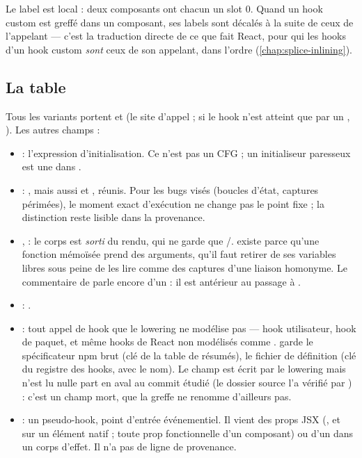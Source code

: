 Le label est local : deux composants ont chacun un slot 0. Quand un hook custom est greffé dans un composant, ses labels sont décalés à la suite de ceux de l'appelant --- c'est la traduction directe de ce que fait React, pour qui les hooks d'un hook custom \emph{sont} ceux de son appelant, dans l'ordre (\cref{chap:splice-inlining}).

\subsection{La table }


Tous les variants portent  et  (le site d'appel ;  si le hook n'est atteint que par un , ). Les autres champs :

\begin{itemize}
  \item {} : l'expression d'initialisation. Ce n'est pas un CFG ; un initialiseur paresseux  est une  dans .
  \item {} : , mais aussi  et , réunis. Pour les bugs visés (boucles d'état, captures périmées), le moment exact d'exécution ne change pas le point fixe ; la distinction reste lisible dans la provenance.
  \item {},  : le corps est \emph{sorti} du rendu, qui ne garde que /.  existe parce qu'une fonction mémoïsée prend des arguments, qu'il faut retirer de ses variables libres sous peine de les lire comme des captures d'une liaison homonyme. Le commentaire de  parle encore d'un  : il est antérieur au passage à .
  \item {} : .
  \item {} : tout appel de hook que le lowering ne modélise pas --- hook utilisateur, hook de paquet, et même hooks de React non modélisés comme .  garde le spécificateur npm brut (clé de la table de résumés),  le fichier de définition (clé du registre des hooks, avec le nom). Le champ  est écrit par le lowering mais n'est lu nulle part en aval au commit étudié (le dossier source l'a vérifié par ) : c'est un champ mort, que la greffe ne renomme d'ailleurs pas.
  \item {} : un pseudo-hook, point d'entrée événementiel. Il vient des props JSX (, et  sur un élément natif ; toute prop fonctionnelle d'un composant) ou d'un  dans un corps d'effet. Il n'a pas de ligne de provenance.
\end{itemize}

